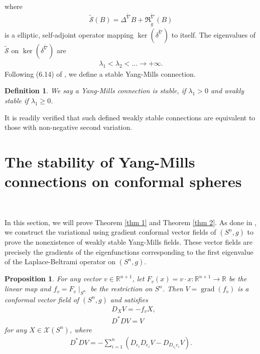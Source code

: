 \documentclass{amsart}
\newtheorem{proposition}{Proposition}[section]
\newtheorem{definition}{Definition}[section]
\begin{document}
	where
	\begin{align*}
		\tilde{\mathscr{S}}(B)=\Delta^{\tilde\nabla}B+\mathfrak{R}^{\tilde\nabla}_{\tilde g}(B)
	\end{align*}
	is a elliptic, self-adjoint operator mapping $\operatorname{ker}(\delta^{\tilde\nabla})$ to itself. The eigenvalues of $\tilde{\mathscr{S}}$ on $\operatorname{ker}(\delta^{\tilde\nabla})$ are
	\begin{align*}
		\lambda_1<\lambda_2<...\to+\infty.
	\end{align*}
	Following (6.14) of \cite{BL}, we define a stable Yang-Mills connection.
	\begin{definition}\label{def:stable}
		We say a Yang-Mills connection is stable, if $\lambda_1>0$ and weakly stable if $\lambda_1\ge0$.
	\end{definition}
	It is readily verified that such defined weakly stable connections are equivalent to those with non-negative second variation.
	\section{The stability of Yang-Mills connections on conformal spheres}\ 
	
	In this section, we will prove Theorem \ref{thm 1} and Theorem \ref{thm 2}. As done in \cite{BL}, we construct the variational using gradient conformal vector fields of $(S^n,g)$ to prove the nonexistence of weakly stable Yang-Mills fields. These vector fields are precisely the gradients of the eigenfunctions corresponding to the first eigenvalue of the Laplace-Beltrami operator on $(S^n,g)$.
	\begin{proposition}\label{conformal vector field}
		For any vector $v\in\mathbb{R}^{n+1}$, let $F_v(x)=v\cdot x:\mathbb{R}^{n+1}\to\mathbb{R}$ be the linear map and $f_v=F_v\mid_{S^n}$ be the restriction on $S^n$. Then $V=\operatorname{grad}(f_v)$ is a conformal vector field of $(S^n,g)$ and satisfies
		\begin{align*}
			&D_XV=-f_vX,\\
			&D^\ast DV=V
		\end{align*}
		for any $X\in\mathscr{X}(S^n)$, where
		\begin{align*}
			D^\ast DV=-\sum_{i=1}^n(D_{e_i}D_{e_i}V-D_{D_{e_i}e_i}V).
		\end{align*}
	\end{proposition}
	
\end{document}
